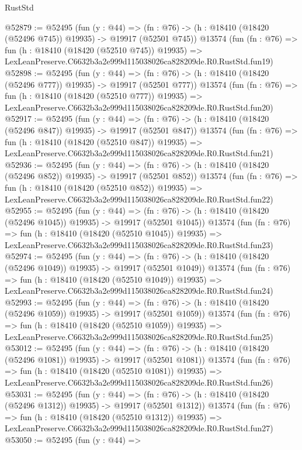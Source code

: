 \begin{lexlean}{RustStd}
\begin{coremodule}
@52879 := @52495
    (fun (y : @44) =>
    (fn : @76) -> (h : @18410 (@18420 (@52496 @745)) @19935) -> @19917 (@52501 @745))
    @13574
    (fun (fn : @76) =>
    fun (h : @18410 (@18420 (@52510 @745)) @19935) =>
    LexLeanPreserve.C6632b3a2e999d115038026ca828209de.R0.RustStd.fun19)
@52898 := @52495
    (fun (y : @44) =>
    (fn : @76) -> (h : @18410 (@18420 (@52496 @777)) @19935) -> @19917 (@52501 @777))
    @13574
    (fun (fn : @76) =>
    fun (h : @18410 (@18420 (@52510 @777)) @19935) =>
    LexLeanPreserve.C6632b3a2e999d115038026ca828209de.R0.RustStd.fun20)
@52917 := @52495
    (fun (y : @44) =>
    (fn : @76) -> (h : @18410 (@18420 (@52496 @847)) @19935) -> @19917 (@52501 @847))
    @13574
    (fun (fn : @76) =>
    fun (h : @18410 (@18420 (@52510 @847)) @19935) =>
    LexLeanPreserve.C6632b3a2e999d115038026ca828209de.R0.RustStd.fun21)
@52936 := @52495
    (fun (y : @44) =>
    (fn : @76) -> (h : @18410 (@18420 (@52496 @852)) @19935) -> @19917 (@52501 @852))
    @13574
    (fun (fn : @76) =>
    fun (h : @18410 (@18420 (@52510 @852)) @19935) =>
    LexLeanPreserve.C6632b3a2e999d115038026ca828209de.R0.RustStd.fun22)
@52955 := @52495
    (fun (y : @44) =>
    (fn : @76) -> (h : @18410 (@18420 (@52496 @1045)) @19935) -> @19917 (@52501 @1045))
    @13574
    (fun (fn : @76) =>
    fun (h : @18410 (@18420 (@52510 @1045)) @19935) =>
    LexLeanPreserve.C6632b3a2e999d115038026ca828209de.R0.RustStd.fun23)
@52974 := @52495
    (fun (y : @44) =>
    (fn : @76) -> (h : @18410 (@18420 (@52496 @1049)) @19935) -> @19917 (@52501 @1049))
    @13574
    (fun (fn : @76) =>
    fun (h : @18410 (@18420 (@52510 @1049)) @19935) =>
    LexLeanPreserve.C6632b3a2e999d115038026ca828209de.R0.RustStd.fun24)
@52993 := @52495
    (fun (y : @44) =>
    (fn : @76) -> (h : @18410 (@18420 (@52496 @1059)) @19935) -> @19917 (@52501 @1059))
    @13574
    (fun (fn : @76) =>
    fun (h : @18410 (@18420 (@52510 @1059)) @19935) =>
    LexLeanPreserve.C6632b3a2e999d115038026ca828209de.R0.RustStd.fun25)
@53012 := @52495
    (fun (y : @44) =>
    (fn : @76) -> (h : @18410 (@18420 (@52496 @1081)) @19935) -> @19917 (@52501 @1081))
    @13574
    (fun (fn : @76) =>
    fun (h : @18410 (@18420 (@52510 @1081)) @19935) =>
    LexLeanPreserve.C6632b3a2e999d115038026ca828209de.R0.RustStd.fun26)
@53031 := @52495
    (fun (y : @44) =>
    (fn : @76) -> (h : @18410 (@18420 (@52496 @1312)) @19935) -> @19917 (@52501 @1312))
    @13574
    (fun (fn : @76) =>
    fun (h : @18410 (@18420 (@52510 @1312)) @19935) =>
    LexLeanPreserve.C6632b3a2e999d115038026ca828209de.R0.RustStd.fun27)
@53050 := @52495
    (fun (y : @44) =>

\end{coremodule}
\end{lexlean}
